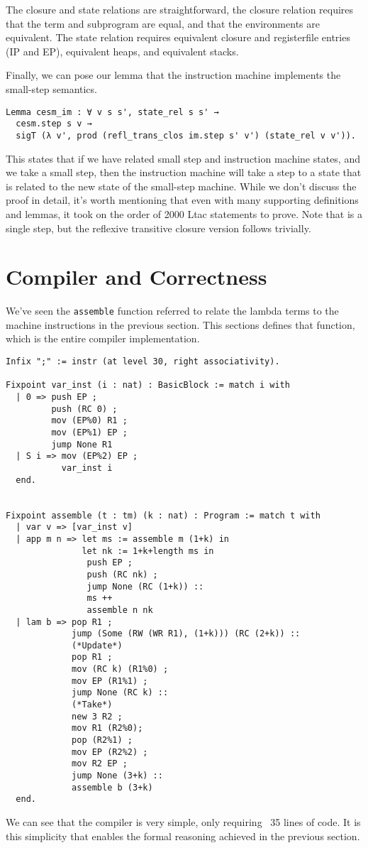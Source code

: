 The closure and state relations are straightforward, the closure relation
requires that the term and subprogram are equal, and that the environments are
equivalent. The state relation requires equivalent closure and registerfile
entries (IP and EP), equivalent heaps, and equivalent stacks.

Finally, we can pose our lemma that the instruction machine implements the
small-step semantics.

\begin{verbatim}
Lemma cesm_im : ∀ v s s', state_rel s s' → 
  cesm.step s v → 
  sigT (λ v', prod (refl_trans_clos im.step s' v') (state_rel v v')).
\end{verbatim}
This states that if we have related small step and instruction machine states,
and we take a small step, then the instruction machine will take a step to a
state that is related to the new state of the small-step machine.  While we
don't discuss the proof in detail, it's worth mentioning that even with many
supporting definitions and lemmas, it took on the order of 2000 Ltac statements
to prove. Note that is a single step, but the reflexive transitive closure
version follows trivially. 

\section{Compiler and Correctness}

We've seen the \texttt{assemble} function referred to relate the lambda terms to
the machine instructions in the previous section. This sections defines that
function, which is the entire compiler implementation.

\begin{verbatim}
Infix ";" := instr (at level 30, right associativity).

Fixpoint var_inst (i : nat) : BasicBlock := match i with
  | 0 => push EP ;
         push (RC 0) ;
         mov (EP%0) R1 ;
         mov (EP%1) EP ;
         jump None R1
  | S i => mov (EP%2) EP ; 
           var_inst i
  end.


Fixpoint assemble (t : tm) (k : nat) : Program := match t with  
  | var v => [var_inst v]
  | app m n => let ms := assemble m (1+k) in
               let nk := 1+k+length ms in
                push EP ;
                push (RC nk) ;
                jump None (RC (1+k)) :: 
                ms ++ 
                assemble n nk
  | lam b => pop R1 ;
             jump (Some (RW (WR R1), (1+k))) (RC (2+k)) ::
             (*Update*)
             pop R1 ;  
             mov (RC k) (R1%0) ;
             mov EP (R1%1) ;
             jump None (RC k) ::
             (*Take*)
             new 3 R2 ;
             mov R1 (R2%0);
             pop (R2%1) ;
             mov EP (R2%2) ;
             mov R2 EP ;
             jump None (3+k) :: 
             assemble b (3+k)
  end. 
\end{verbatim}
We can see that the compiler is very simple, only requiring ~35 lines of code.
It is this simplicity that enables the formal reasoning achieved in the previous
section. 

